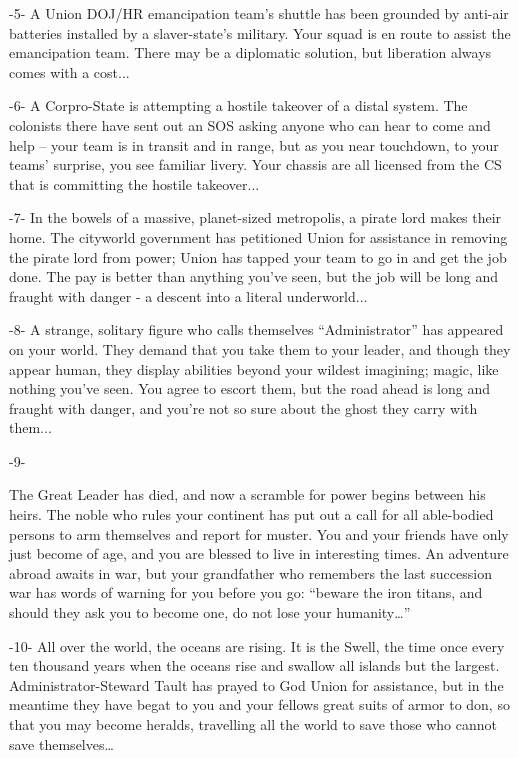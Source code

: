                                                      -5-
A Union DOJ/HR emancipation team’s shuttle has been grounded by anti-air batteries installed by
a slaver-state’s military. Your squad is en route to assist the emancipation team. There may be a
diplomatic solution, but liberation always comes with a cost...

                                                     -6-
A Corpro-State is attempting a hostile takeover of a distal system. The colonists there have sent
out an SOS asking anyone who can hear to come and help -- your team is in transit and in range,
but as you near touchdown, to your teams’ surprise, you see familiar livery. Your chassis are all
licensed from the CS that is committing the hostile takeover...

                                                     -7-
In the bowels of a massive, planet-sized metropolis, a pirate lord makes their home. The cityworld
government has petitioned Union for assistance in removing the pirate lord from power; Union
has tapped your team to go in and get the job done. The pay is better than anything you’ve seen,
but the job will be long and fraught with danger - a descent into a literal underworld...

                                                     -8-
A strange, solitary figure who calls themselves “Administrator” has appeared on your world. They
demand that you take them to your leader, and though they appear human, they display abilities
beyond your wildest imagining; magic, like nothing you’ve seen. You agree to escort them, but
the road ahead is long and fraught with danger, and you’re not so sure about the ghost they carry
with them...

                                                     -9-




The Great Leader has died, and now a scramble for power begins between his heirs. The noble
who rules your continent has put out a call for all able-bodied persons to arm themselves and
report for muster. You and your friends have only just become of age, and you are blessed to live
in interesting times. An adventure abroad awaits in war, but your grandfather who remembers the
last succession war has words of warning for you before you go: “beware the iron titans, and
should they ask you to become one, do not lose your humanity…”

                                                        -10-
All over the world, the oceans are rising. It is the Swell, the time once every ten thousand years
when the oceans rise and swallow all islands but the largest. Administrator-Steward Tault has
prayed to God Union for assistance, but in the meantime they have begat to you and your fellows
great suits of armor to don, so that you may become heralds, travelling all the world to save those
who cannot save themselves…

